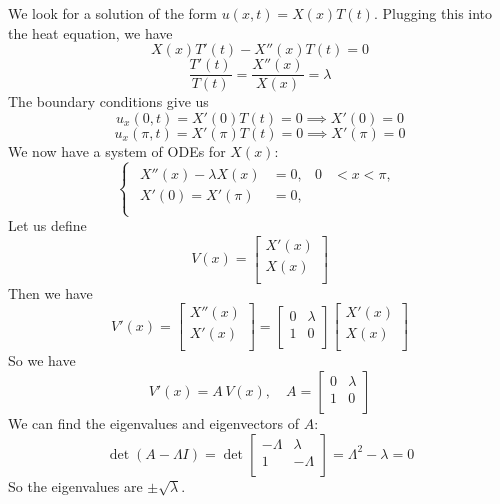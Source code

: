 \documentclass[plain]{pset}
\begin{document}
\begin{solution}
    We look for a solution of the form \(u(x, t) = X(x)T(t)\). Plugging this into the heat equation, we have
    \[X(x)T'(t) - X''(x)T(t)  = 0\]
    \[\frac{T'(t)}{T(t)}      = \frac{X''(x)}{X(x)} = \lambda\]
    The boundary conditions give us
    \[u_x(0, t) = X'(0)T(t) = 0 \implies X'(0) = 0\]
    \[u_x(\pi, t) = X'(\pi)T(t) = 0 \implies X'(\pi) = 0\]
    We now have a system of ODEs for \(X(x)\):
    \[
        \begin{cases}
            \begin{aligned}
                X''(x) - \lambda X(x) & = 0, & 0 & < x < \pi, \\
                X'(0) = X'(\pi)       & = 0, &   &            \\
            \end{aligned}
        \end{cases}
    \]
    Let us define
    \[V(x) = \begin{bmatrix}
            X'(x) \\
            X(x)  \\
        \end{bmatrix}\]
    Then we have
    \[V'(x) = \begin{bmatrix}
            X''(x) \\
            X'(x)  \\
        \end{bmatrix} = \begin{bmatrix}
            0 & \lambda \\
            1 & 0       \\
        \end{bmatrix}\begin{bmatrix}
            X'(x) \\
            X(x)  \\
        \end{bmatrix}
    \]
    So we have
    \[V'(x) = A\,V(x), \quad A = \begin{bmatrix}
            0 & \lambda \\
            1 & 0       \\
        \end{bmatrix}\]
    We can find the eigenvalues and eigenvectors of \(A\):
    \[\det(A - \Lambda I) = \det\begin{bmatrix}
            -\Lambda & \lambda  \\
            1        & -\Lambda \\
        \end{bmatrix} = \Lambda^2 - \lambda = 0\]
    So the eigenvalues are \(\pm\sqrt{\lambda}\).


\end{solution}
\end{document}
